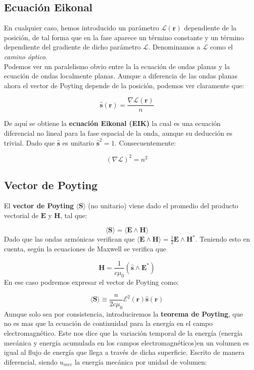 \documentclass[12pt,a4paper]{book}
\numberwithin{equation}{section}
\numberwithin{figure}{section}
\newcommand{\1}{_{(1)}}
\newcommand{\2}{_{(2)}}
\newcommand{\rn}{\mathbf{r}}
\newcommand{\sn}{\mathbf{s}}
\newcommand{\Sn}{\mathbf{S}}
\newcommand{\En}{\mathbf{E}}
\newcommand{\Hn}{\mathbf{H}}
\newcommand{\hns}{\hat{\sn}}
\theoremstyle{definition}
\begin{document}
\subsection{Ecuación Eikonal}

En cualquier caso, hemos introducido un parámetro $\mathcal{L} (\rn)$ dependiente de la posición, de tal forma que en la fase aparece un término constante y un término dependiente del gradiente de dicho parámetro $\mathcal{L}$. Denominamos a $\mathcal{L}$ como el \textit{camino óptico}. \\

Podemos ver un paralelismo obvio entre la la ecuación de ondas planas y la ecuación de ondas localmente planas. Aunque a diferencia de las ondas planas ahora el vector de Poyting depende de la posición, podemos ver claramente que:

\begin{equation}
\hns (\rn) = \dfrac{\nabla \mathcal{L} (\rn)}{n} \label{Ec:01.02.1-Poyting_unitario}
\end{equation}

De aquí se obtiene la \textbf{ecuación Eikonal (EIK)} la cual es una ecuación diferencial no lineal para la fase espacial de la onda, aunque su deducción es trivial. Dado que $\hns$ es unitario $\hns^2 =1$. Consecuentemente:

\begin{equation}
(\nabla \mathcal{L})^2 = n^2
\end{equation}

\subsection{Vector de Poyting}

El \textbf{vector de Poyting} $\langle \Sn \rangle$ (no unitario) viene dado el promedio del producto vectorial de $\En$ y $\Hn$, tal que:

\begin{equation}
\langle \Sn \rangle  = \langle \En \wedge \Hn \rangle
\end{equation}
Dado que las ondas armónicas verifican que $\langle \En \wedge \Hn \rangle = \frac{1}{2} \En \wedge \Hn^*$. Teniendo esto en cuenta, según la ecuaciones de Maxwell se verifica que

$$ \Hn = \dfrac{1}{c \mu_0} (\hns \wedge \En^* ) $$
En ese caso podremos expresar el vector de Poyting como:

\begin{equation}
\langle \Sn \rangle \equiv \dfrac{n}{2 c \mu_0} \mathcal{E}^2 (\rn) \hns  (\rn)
\end{equation}
Aunque solo sea por consistencia, introduciremos la \textbf{teorema de Poyting}, que no es mas que la ecuación de continuidad para la energía en el campo electromagnético. Este nos dice que la variación temporal de la energía (energía mecánica y energía acumulada en los campos electromagnéticos)en un volumen es igual al flujo de energía que llega a través de dicha superficie. Escrito de manera diferencial, siendo $u_{mec}$ la energía mecánica por unidad de volumen:
\end{document}
